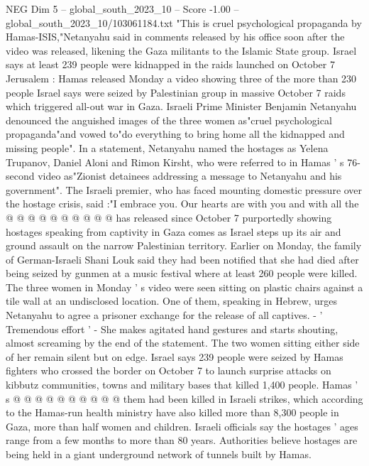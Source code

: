 \begin{textsample}{NEG Dim 5 – global\_south\_2023\_10 – Score -1.00 – global\_south\_2023\_10/103061184.txt}  \label{ex:f5_neg_070}
"This is cruel psychological propaganda by Hamas-ISIS,"Netanyahu said in comments released by his office soon after the video was released, likening the Gaza militants to the Islamic State group.
Israel says at least 239 people were kidnapped in the raids launched on October 7 Jerusalem : Hamas released Monday a video showing three of the more than 230 people Israel says were seized by Palestinian group in massive October 7 raids which triggered all-out war in Gaza.
Israeli Prime Minister Benjamin Netanyahu denounced the anguished images of the three women as"cruel psychological propaganda"and vowed to"do everything to bring home all the kidnapped and missing people".
In a statement, Netanyahu named the hostages as Yelena Trupanov, Daniel Aloni and Rimon Kirsht, who were referred to in Hamas ' s 76-second video as"Zionist detainees addressing a message to Netanyahu and his government".
The Israeli premier, who has faced mounting domestic pressure over the hostage crisis, said :"I embrace you.
Our hearts are with you and with all the @ @ @ @ @ @ @ @ @ @ has released since October 7 purportedly showing hostages speaking from captivity in Gaza comes as Israel steps up its air and ground assault on the narrow Palestinian territory.
Earlier on Monday, the family of German-Israeli Shani Louk said they had been notified that she had died after being seized by gunmen at a music festival where at least 260 people were killed.
The three women in Monday ' s video were seen sitting on plastic chairs against a tile wall at an undisclosed location.
One of them, speaking in Hebrew, urges Netanyahu to agree a prisoner exchange for the release of all captives. - ' Tremendous effort ' - She makes agitated hand gestures and starts shouting, almost screaming by the end of the statement.
The two women sitting either side of her remain silent but on edge.
Israel says 239 people were seized by Hamas fighters who crossed the border on October 7 to launch surprise attacks on kibbutz communities, towns and military bases that killed 1,400 people.
Hamas ' s @ @ @ @ @ @ @ @ @ @ them had been killed in Israeli strikes, which according to the Hamas-run health ministry have also killed more than 8,300 people in Gaza, more than half women and children.
Israeli officials say the hostages ' ages range from a few months to more than 80 years.
Authorities believe hostages are being held in a giant underground network of tunnels built by Hamas.

\end{textsample}
